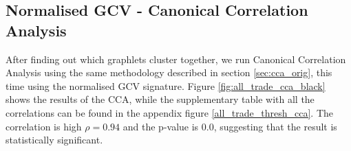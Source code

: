 \subsection{Normalised GCV - Canonical Correlation Analysis}
\label{cca_trade_norm1}

After finding out which graphlets cluster together, we run Canonical Correlation Analysis using the same methodology described in section \ref{sec:cca_orig}, this time using the normalised GCV signature. Figure \ref{fig:all_trade_cca_black} shows the results of the CCA, while the supplementary table with all the correlations can be found in the appendix figure \ref{all_trade_thresh_cca}. The correlation is high $\rho = 0.94$ and the p-value is 0.0, suggesting that the result is statistically significant. 




% 



